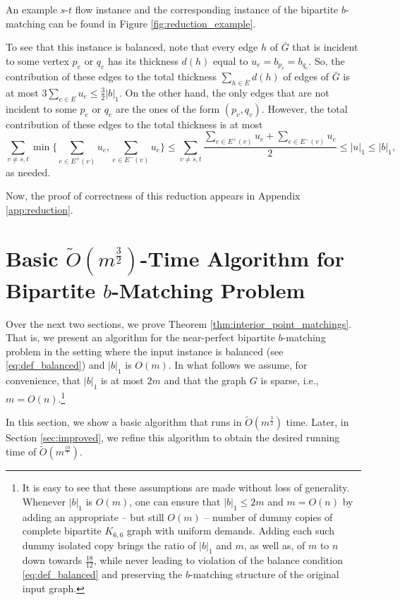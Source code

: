 \documentclass[11pt, letterpaper]{article}
\newcommand{\onorm}[1]{|#1|_{1}}
\newcommand{\tO}[1]{\widetilde{O}(#1)}
\newcommand{\oG}{\bar{G}}
\newcommand{\cG}{{G}}
\newcommand{\oE}{\bar{E}}
\newcommand{\cm}{{m}}
\newcommand{\cn}{{n}}
\newcommand{\bb}{\boldsymbol{\mathit{b}}}
\newcommand{\uu}{\boldsymbol{\mathit{u}}}
\begin{document}
An example $s$-$t$ flow instance and the corresponding instance of the bipartite $\bb$-matching can be found in Figure \ref{fig:reduction_example}.

To see that this instance is balanced, note that every edge $h$ of $\oG$ that is incident to some vertex $p_e$ or $q_e$ has its thickness $d(h)$ equal to $u_e=b_{p_e}=b_{q_e}$. So, the contribution of these edges to the total thickness $\sum_{h\in \oE} d(h)$ of edges of $\oG$ is at most $3 \sum_{e\in E} u_e \leq \frac{3}{2} \onorm{\bb}$. On the other hand, the only edges that are not incident to some $p_e$ or $q_e$ are the ones of the form $(p_v,q_v)$. However, the total contribution of these edges to the total thickness is at most 
\[
\sum_{v\neq s,t} \min\{\sum_{e\in E^+(v)} u_e,\sum_{e\in E^-(v)} u_e\}\leq \sum_{v\neq s,t} \frac{\sum_{e\in E^+(v)} u_e +\sum_{e\in E^-(v)} u_e}{2} \leq \onorm{\uu} \leq \onorm{\bb},  
\]
as needed.


Now, the proof of correctness of this reduction appears in Appendix \ref{app:reduction}.  
\section{Basic \texorpdfstring{$\tO{m^{\frac{3}{2}}}$-Time}{\~O(m\textasciicircum(3/2))-Time} Algorithm for Bipartite $\bb$-Matching Problem}
\label{sec:simple}



Over the next two sections, we prove Theorem \ref{thm:interior_point_matchings}. That is, we present an algorithm for the {near-perfect} bipartite $\bb$-matching problem in the setting where the input instance is balanced (see \eqref{eq:def_balanced}) and $\onorm{\bb}$ is $O(\cm)$. In what follows we assume, for convenience, that $\onorm{\bb}$ is at most $2\cm$ and that the graph $\cG$ is sparse, i.e., $\cm=O(\cn)$.\footnote{It is easy to see that these assumptions are made without loss of generality. Whenever $\onorm{\bb}$ is $O(\cm)$, one can ensure that $\onorm{\bb}\leq 2 \cm$ and $\cm=O(\cn)$ by adding an appropriate -- but still $O(\cm)$ -- number of dummy copies of complete bipartite $K_{6,6}$ graph with uniform demands. Adding each such dummy isolated copy brings the ratio of $\onorm{\bb}$ and $\cm$, as well as, of $\cm$ to $n$ down towards $\frac{18}{12}$, while never leading to violation of the balance condition \eqref{eq:def_balanced} and preserving the $\bb$-matching structure of the original input graph.} 




In this section, we show a basic algorithm that runs in $\tO{\cm^{\frac{3}{2}}}$ time. Later, in Section \ref{sec:improved}, we refine this algorithm to obtain the desired running time of $\tO{\cm^{\frac{10}{7}}}$.
\end{document}
